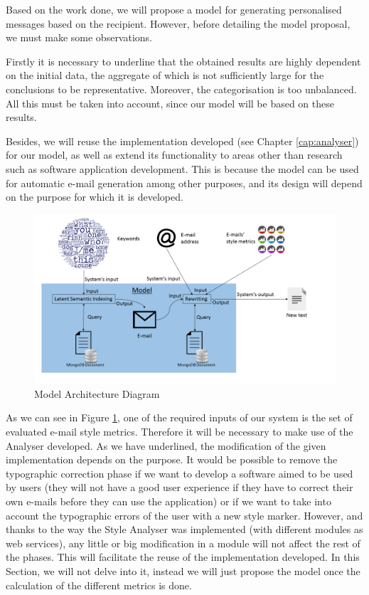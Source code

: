 Based on the work done, we will propose a model for generating personalised messages based on the recipient. However, before detailing the model proposal, we must make some observations.

Firstly it is necessary to underline that the obtained results are highly dependent on the initial data, the aggregate of which is not sufficiently large for the conclusions to be representative. Moreover, the categorisation is too unbalanced. All this must be taken into account, since our model will be based on these results.

Besides, we will reuse the implementation developed (see Chapter \ref{cap:analyser}) for our model, as well as extend its functionality to areas other than research such as software application development. This is because the model can be used for automatic e-mail generation among other purposes, and its design will depend on the purpose for which it is developed.

\begin{figure}
	\centering%
	\centerline{\includegraphics[width = 1.2\textwidth]{Imagenes/Bitmap/model.png}}%
	\caption{Model Architecture Diagram}%
	\label{fig:modarch}
\end{figure}

As we can see in Figure \ref{fig:modarch}, one of the required inputs of our system is the set of evaluated e-mail style metrics. Therefore it will be necessary to make use of the Analyser developed. As we have underlined, the modification of the given implementation depends on the purpose. It would be possible to remove the typographic correction phase if we want to develop a software aimed to be used by users (they will not have a good user experience if they have to correct their own e-mails before they can use the application) or if we want to take into account the typographic errors of the user with a new style marker. However, and thanks to the way the Style Analyser was implemented (with different modules as web services), any little or big modification in a module will not affect the rest of the phases. This will facilitate the reuse of the implementation developed. In this Section, we will not delve into it, instead we will just propose the model once the calculation of the different metrics is done.


